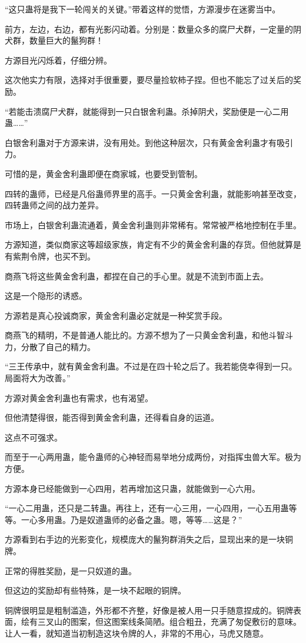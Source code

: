 \begin{this_body}
“这只蛊将是我下一轮闯关的关键。”带着这样的觉悟，方源漫步在迷雾当中。

前方，左边，右边，都有光影闪动着。分别是：数量众多的腐尸犬群，一定量的阴犬群，数量巨大的鬣狗群！

方源目光闪烁着，仔细分辨。

这次他实力有限，选择对手很重要，要尽量捡软柿子捏。但也不能忘了过关后的奖励。

“若能击溃腐尸犬群，就能得到一只白银舍利蛊。杀掉阴犬，奖励便是一心二用蛊……”

白银舍利蛊对于方源来讲，没有用处。到他这种层次，只有黄金舍利蛊才有吸引力。

可惜的是，黄金舍利蛊即便在商家城，也要受到管制。

四转的蛊师，已经是凡俗蛊师界里的高手。一只黄金舍利蛊，就能影响甚至改变，四转蛊师之间的战力差异。

市场上，白银舍利蛊流通着，黄金舍利蛊则非常稀有。常常被严格地控制在手里。

方源知道，类似商家这等超级家族，肯定有不少的黄金舍利蛊的存货。但他就算是有紫荆令牌，也买不到。

商燕飞将这些黄金舍利蛊，都捏在自己的手心里。就是不流到市面上去。

这是一个隐形的诱惑。

方源若是真心投诚商家，黄金舍利蛊必定就是一种奖赏手段。

商燕飞的精明，不是普通人能比的。方源不想为了一只黄金舍利蛊，和他斗智斗力，分散了自己的精力。

“三王传承中，就有黄金舍利蛊。不过是在四十轮之后了。我若能侥幸得到一只。局面将大为改善。”

方源对黄金舍利蛊也有需求，也有渴望。

但他清楚得很，能否得到黄金舍利蛊，还得看自身的运道。

这点不可强求。

而至于一心两用蛊，能令蛊师的心神轻而易举地分成两份，对指挥虫兽大军。极为方便。

方源本身已经能做到一心四用，若再增加这只蛊，就能做到一心六用。

“一心二用蛊，还只是二转蛊。再往上，还有一心三用，一心四用，一心五用蛊等等。一心多用蛊。乃是奴道蛊师的必备之蛊。嗯，等等……这是？”

方源看到右手边的光影变化，规模庞大的鬣狗群消失之后，显现出来的是一块铜牌。

正常的得胜奖励，是一只奴道的蛊。

但这边的奖励却有些特殊，是一块不起眼的铜牌。

铜牌很明显是粗制滥造，外形都不齐整，好像是被人用一只手随意捏成的。铜牌表面，绘有三叉山的图案，但这图案线条简陋。组合粗丑，充满了匆促敷衍的意味。让人一看，就知道当初制造这块令牌的人，非常的不用心，马虎又随意。


\end{this_body}
